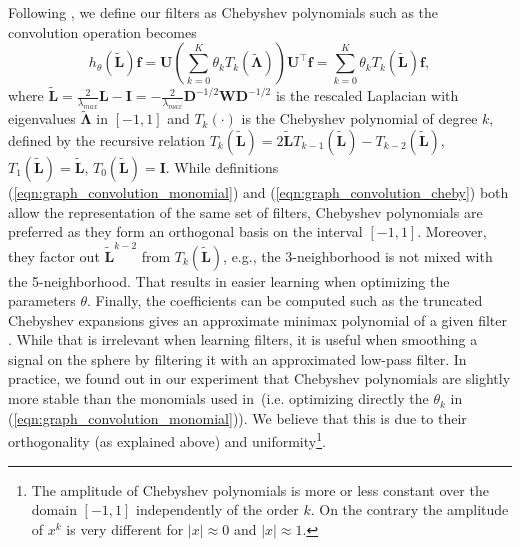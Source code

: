 \documentclass[final,twocolumn,3p,times,authoryear]{elsarticle}
\newcommand{\nati}[1]{{\color[rgb]{.1,.6,.1}{#1}}}
\newcommand{\todo}[1]{{\color[rgb]{.6,.1,.6}{#1}}}
\newcommand{\eqnref}[1]{(\ref{eqn:#1})}
\renewcommand{\b}[1]{{\bm{#1}}}   %
\newcommand{\1}{\b{1}}              %
\newcommand{\0}{\b{0}}              %
\renewcommand{\L}{\b{L}}
\newcommand{\tL}{\tilde{\L}}
\newcommand{\W}{\b{W}}
\newcommand{\D}{\b{D}}
\newcommand{\U}{\b{U}}
\newcommand{\f}{\b{f}}
\newcommand{\trans}{^\intercal}
\newcommand{\bLambda}{\b{\Lambda}}
\begin{document}
Following \citet{defferrard2016convolutional}, we define our filters as Chebyshev polynomials such as the convolution operation becomes
\begin{equation} \label{eqn:graph_convolution_cheby}
	h_\theta\left(\tL\right) \f = \U \left(\sum_{k=0}^K \theta_k T_k\left(\tilde{\bLambda}\right) \right) \U\trans \f = \sum_{k=0}^K \theta_k T_k\left(\tL\right) \f,
\end{equation}
where $\tL = \frac{2}{\lambda_{max}} \L - \b{I} = -\frac{2}{\lambda_{max}} \D^{-1/2} \W \D^{-1/2}$ is the rescaled Laplacian with eigenvalues $\tilde{\b \Lambda}$ in $[-1, 1]$ and $T_k(\cdot)$ is the Chebyshev polynomial of degree $k$, defined by the recursive relation $T_k(\tL) = 2\tL T_{k-1}(\tL) - T_{k-2}(\tL)$, $T_1(\tL) = \tL$, $T_0(\tL) = \b{I}$. While definitions \eqnref{graph_convolution_monomial} and \eqnref{graph_convolution_cheby} both allow the representation of the same set of filters, Chebyshev polynomials are preferred as they form an orthogonal basis on the interval $[-1, 1]$. Moreover, they factor out $\tL^{k-2}$ from $T_k(\tL)$, e.g., the 3-neighborhood is not mixed with the 5-neighborhood. That results in easier learning when optimizing the parameters $\theta$.
Finally, the coefficients can be computed such as the truncated Chebyshev expansions gives an approximate minimax polynomial of a given filter \citep{hammond2011wavelets}. While that is irrelevant when learning filters, it is useful when smoothing a signal on the sphere by filtering it with an approximated low-pass filter.
In practice, we found out in our experiment that Chebyshev polynomials are slightly more stable than the monomials used in~\cite{khasanova2017graphomni}(i.e. optimizing directly the $\theta_k$ in \eqnref{graph_convolution_monomial}).
We believe that this is due to their orthogonality (as explained above) and uniformity\footnote{The amplitude of Chebyshev polynomials is more or less constant over the domain $[-1, 1]$ independently of the order $k$. On the contrary the amplitude of $x^k$ is very different for $|x|\approx 0$ and $|x| \approx 1$.}.
\end{document}

